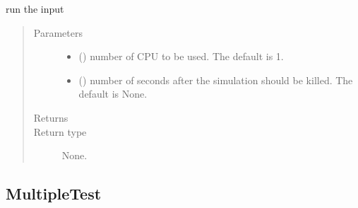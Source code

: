 \documentclass[letterpaper,10pt,english]{sphinxmanual}
\begin{document}
\begin{fulllineitems}
\begin{fulllineitems}
\label{\detokenize{api/inputgeneration:testrun.Test.run}}
\sphinxAtStartPar
run the input
\begin{quote}\begin{description}
\item[{Parameters}] \leavevmode\begin{itemize}
\item {} 
\sphinxAtStartPar
{} (\sphinxstyleliteralemphasis{\sphinxupquote{, }}) \textendash{} number of CPU to be used. The default is 1.

\item {} 
\sphinxAtStartPar
{} (\sphinxstyleliteralemphasis{\sphinxupquote{, }}) \textendash{} number of seconds after the simulation should be killed.
The default is None.

\end{itemize}

\item[{Returns}] \leavevmode
\sphinxAtStartPar


\item[{Return type}] \leavevmode
\sphinxAtStartPar
None.

\end{description}\end{quote}

\end{fulllineitems}


\end{fulllineitems}



\subsection{MultipleTest}
\label{\detokenize{api/inputgeneration:multipletest}}\label{\detokenize{api/inputgeneration:multitestob}}
\end{document}
